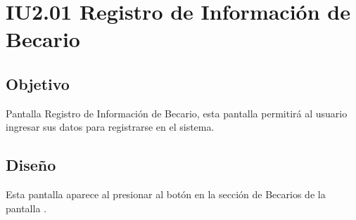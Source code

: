 \newpage
\section{IU2.01 Registro de Información de Becario}

\subsection{Objetivo}
	Pantalla Registro de Información de Becario, esta pantalla permitirá al usuario ingresar sus datos para registrarse en el sistema.
	


\subsection{Diseño}
	Esta pantalla aparece al presionar al botón  en la sección de Becarios de la pantalla .

	
